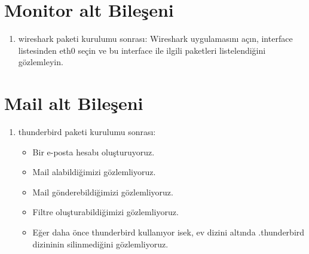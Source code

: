 \documentclass[a4paper,10pt]{article}
\begin{document}
\section{Monitor alt Bileşeni}
\begin{enumerate}
 \item wireshark paketi kurulumu sonrası:
	Wireshark uygulamasını açın, interface listesinden eth0 seçin ve bu interface ile ilgili paketleri listelendiğini gözlemleyin.
\end{enumerate}

\section{Mail alt Bileşeni}
\begin{enumerate}
 \item thunderbird paketi kurulumu sonrası:
\begin{itemize}
\item Bir e-posta hesabı oluşturuyoruz.
\item Mail alabildiğimizi gözlemliyoruz.
\item Mail gönderebildiğimizi gözlemliyoruz.
\item Filtre oluşturabildiğimizi gözlemliyoruz.
\item Eğer daha önce thunderbird kullanıyor isek, ev dizini altında .thunderbird dizininin silinmediğini gözlemliyoruz.
\end{itemize}

\end{enumerate}
\end{document}
